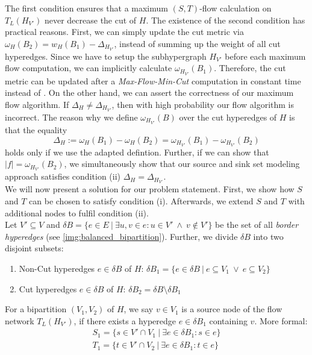 The first condition ensures that a maximum $(S,T)$-flow calculation on $T_L(H_{V'})$ never 
decrease the cut of $H$. The existence of the second condition has practical reasons. First, we
can simply update the cut metric via $\omega_H(B_2) = w_H(B_1) - \Delta_{H_{V'}}$,
instead of summing up the weight of all cut hyperedges. Since we have to setup the subhypergraph
$H_{V'}$ before each maximum flow computation, we can implicitly calculate $\omega_{H_{V'}}(B_1)$.
Therefore, the cut metric can be updated after a \emph{Max-Flow-Min-Cut} computation
in constant time instead of . On the other hand, we can assert the correctness of
our maximum flow algorithm. If $\Delta_H \neq \Delta_{H_{V'}}$, then with high probability our
flow algorithm is incorrect. The reason why we define $\omega_{H_{V'}}(B)$ over
the cut hyperedges of $H$ is that the equality
\[\Delta_{H} := \omega_H(B_1) - \omega_H(B_2) = \omega_{H_{V'}}(B_1) - \omega_{H_{V'}}(B_2)\]
holds only if we use the adapted defintion. 
Further, if we can show that $|f| = \omega_{H_{V'}}(B_2)$, we simultaneously show
that our source and sink set modeling approach satisfies condition (ii) 
$\Delta_H = \Delta_{H_{V'}}$.\\
We will now present a solution for our problem statement. First, we show how $S$ and $T$
can be chosen to satisfy condition (i). Afterwards, we extend $S$ and $T$ with additional
nodes to fulfil condition (ii). \\
Let $V' \subseteq V$ and $\delta B = \{ e \in E\ |\ \exists u,v \in e: u \in V'\ \land\ v \notin V' \}$
be the set of all \emph{border hyperedges} (see \autoref{img:balanced_bipartition}). 
Further, we divide $\delta B$ into two disjoint subsets:
\begin{enumerate}
\item Non-Cut hyperedges $e \in \delta B$ of $H$: $\delta B_1 = \{ e \in \delta B \ |\ e \subseteq V_1\ \lor\ e \subseteq V_2 \}$
\item Cut hyperedges $e \in \delta B$ of $H$: $\delta B_2 = \delta B \setminus \delta B_1$
\end{enumerate}
For a bipartition $(V_1,V_2)$ of $H$, we say
$v \in V_1$ is a source node of the flow network $T_L(H_{V'})$, if there exists
a hyperedge $e \in \delta B_1$ containing $v$. More formal:
\begin{align}
S_1 = \{ s \in V' \cap V_1\ |\ \exists e \in \delta B_1: s \in e \} \label{S1_border_hyperedges}\\
T_1 = \{ t \in V' \cap V_2\ |\ \exists e \in \delta B_1: t \in e \} \label{T1_border_hyperedges}
\end{align}

